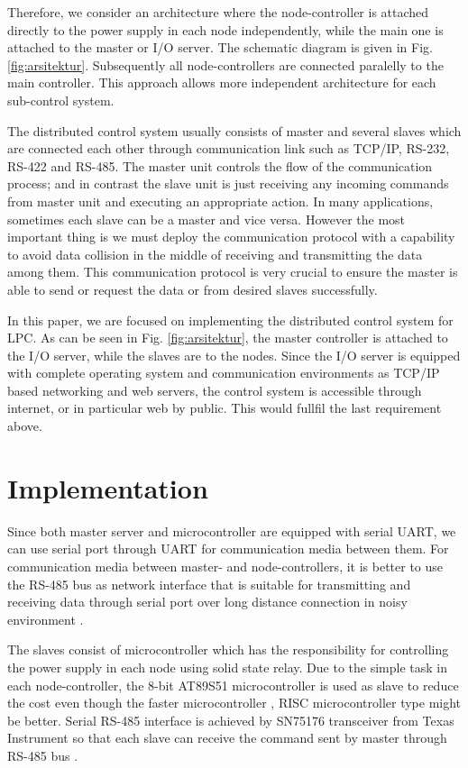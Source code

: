 \documentclass[conference,letterpaper]{IEEEtran}
\begin{document}
Therefore, we consider an architecture where the node-controller is attached directly to the power supply in each node independently, while the main one is attached to the master or I/O server. The schematic diagram is given in Fig. \ref{fig:arsitektur}. Subsequently all node-controllers are connected paralelly to the main controller. This approach allows more independent architecture for each sub-control system. 

The distributed control system usually consists of master and several slaves which are connected each other through communication link such as TCP/IP, RS-232, RS-422 and RS-485. The master unit controls the flow of the communication process; and in contrast the slave unit is just receiving any incoming commands from master unit and executing an appropriate action. In many applications, sometimes each slave can be a master and vice versa. However the most important thing is we must deploy the communication protocol with a capability to avoid data collision in the middle of receiving and transmitting the data among them. This communication protocol is very crucial to ensure the master is able to send or request the data or from desired slaves successfully. 

In this paper, we are focused on implementing the distributed control system for LPC. As can be seen in Fig. \ref{fig:arsitektur}, the master controller is attached to the I/O server, while the slaves are to the nodes. Since the I/O server is equipped with complete operating system and communication environments as TCP/IP based networking and web servers, the control system is accessible through internet, or in particular web by public. This would fullfil the last requirement above.

\section{Implementation}
\label{sec:implementasi}

Since both master server and microcontroller are equipped with serial UART, we can use  serial port through UART for communication media between them. For communication media between master- and node-controllers, it is better to use the RS-485 bus as network interface that is suitable for transmitting and receiving data through serial port over long distance connection in noisy environment \cite{mcmillan}.

The slaves consist of microcontroller which has the responsibility for controlling the  power supply in each node using solid state relay. Due to the simple task in each node-controller, the 8-bit AT89S51 microcontroller is used as slave to reduce the cost even though the faster microcontroller \cite{mikro,bhargav}, RISC microcontroller type might be better. Serial RS-485 interface is achieved by SN75176 transceiver from Texas Instrument so that each slave can receive the command sent by master through RS-485 bus \cite{bolic}.
\end{document}
